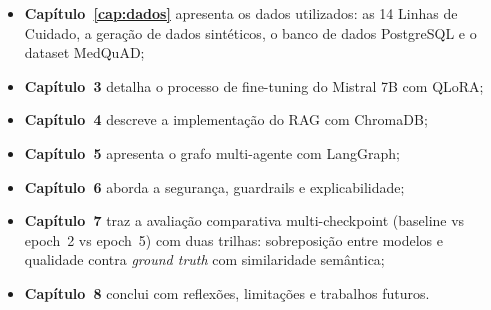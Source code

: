 \begin{itemize}
    \item \textbf{Capítulo~\ref{cap:dados}} apresenta os dados utilizados: as 14 Linhas de Cuidado, a geração de dados sintéticos, o banco de dados PostgreSQL e o dataset MedQuAD;
    \item \textbf{Capítulo~3} detalha o processo de fine-tuning do Mistral 7B com QLoRA;
    \item \textbf{Capítulo~4} descreve a implementação do RAG com ChromaDB;
    \item \textbf{Capítulo~5} apresenta o grafo multi-agente com LangGraph;
    \item \textbf{Capítulo~6} aborda a segurança, guardrails e explicabilidade;
    \item \textbf{Capítulo~7} traz a avaliação comparativa multi-checkpoint (baseline vs epoch~2 vs epoch~5) com duas trilhas: sobreposição entre modelos e qualidade contra \textit{ground truth} com similaridade semântica;
    \item \textbf{Capítulo~8} conclui com reflexões, limitações e trabalhos futuros.
\end{itemize}

